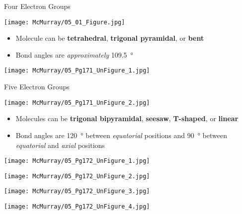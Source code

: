 \documentclass[notes=hide]{beamer}
\begin{document}
\begin{frame}[allowframebreaks]{Four Electron Groups}
	\begin{center}
		\texttt{[image: McMurray/05\_01\_Figure.jpg]}
	\end{center}

	\bigskip
	
	\begin{itemize}
		\item Molecule can be \textbf{tetrahedral},
			\textbf{trigonal pyramidal}, or \textbf{bent}
		\item Bond angles are \emph{approximately}
			\SI{109.5}{\degree}
	\end{itemize}

	\framebreak

	\begin{center}
		\texttt{[image: McMurray/05\_Pg171\_UnFigure\_1.jpg]}
	\end{center}
\end{frame}

\begin{frame}[allowframebreaks]{Five Electron Groups}
	\begin{center}
		\texttt{[image: McMurray/05\_Pg171\_UnFigure\_2.jpg]}
	\end{center}

	\bigskip

	\begin{itemize}
		\item Molecules can be \textbf{trigonal bipyramidal},
			\textbf{seesaw}, \textbf{T-shaped},
			or \textbf{linear}
		\item Bond angles are \SI{120}{\degree} between
			\emph{equatorial} positions and \SI{90}{\degree}
			between \emph{equatorial} and \emph{axial}
			positions
	\end{itemize}

	\framebreak

	\begin{center}
		\texttt{[image: McMurray/05\_Pg172\_UnFigure\_1.jpg]}

		\bigskip

		\texttt{[image: McMurray/05\_Pg172\_UnFigure\_2.jpg]}
	\end{center}

	\framebreak

	\begin{center}
		\texttt{[image: McMurray/05\_Pg172\_UnFigure\_3.jpg]}

		\bigskip

		\texttt{[image: McMurray/05\_Pg172\_UnFigure\_4.jpg]}
	\end{center}
\end{frame}
\end{document}

